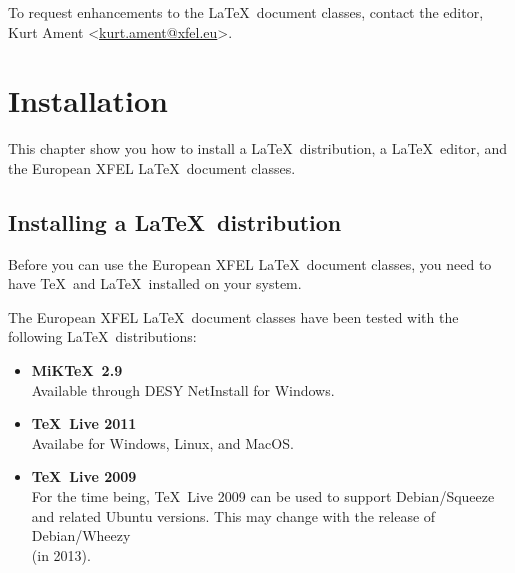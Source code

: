 \documentclass[]{xfel.eu-report}
\begin{document}
To request enhancements to the \LaTeX\ document classes, contact the editor, 
Kurt Ament <\href{mailto:kurt.ament@xfel.eu}{kurt.ament@xfel.eu}>.

\stopcontents


\chapter{Installation}

\startcontents


This chapter show you how to install a \LaTeX\ distribution,  a \LaTeX\ editor, and the European XFEL \LaTeX\ document classes.
\linebreak






\section{Installing a \LaTeX\ distribution}
\label{installing-latex}

Before you can use the European XFEL \LaTeX\ document classes, you need to have 
\TeX\ and \LaTeX\ installed on your system. 

The European XFEL \LaTeX\ document classes have been tested with the following
\LaTeX\ distributions: 

\begin{itemize}
\item {\bf MiK\TeX\  2.9} \\   
Available through DESY NetInstall for Windows.  
\linebreak

\item {\bf \TeX\ Live 2011} \\    
Availabe for Windows, Linux, and MacOS.
\linebreak

\item {\bf \TeX\ Live 2009} \\     
For the time being, \TeX\ Live 2009 can be used to support Debian/Squeeze and related Ubuntu versions. This may change with the release of Debian/Wheezy \\
(in 2013).
\end{itemize}
\end{document}
